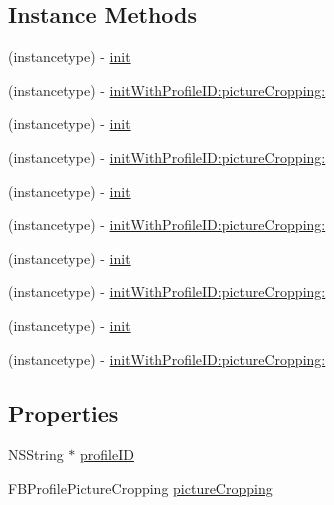 \subsection*{Instance Methods}
\begin{DoxyCompactItemize}
\item 
(instancetype) -\/ \hyperlink{interfaceFBProfilePictureView_aaef716a319774e7c6d21ae51accaf449}{init}
\item 
(instancetype) -\/ \hyperlink{interfaceFBProfilePictureView_ac31bbd3ec87c79d3b1ccd4f3466e46b1}{init\+With\+Profile\+I\+D\+:picture\+Cropping\+:}
\item 
(instancetype) -\/ \hyperlink{interfaceFBProfilePictureView_aaef716a319774e7c6d21ae51accaf449}{init}
\item 
(instancetype) -\/ \hyperlink{interfaceFBProfilePictureView_ac31bbd3ec87c79d3b1ccd4f3466e46b1}{init\+With\+Profile\+I\+D\+:picture\+Cropping\+:}
\item 
(instancetype) -\/ \hyperlink{interfaceFBProfilePictureView_aaef716a319774e7c6d21ae51accaf449}{init}
\item 
(instancetype) -\/ \hyperlink{interfaceFBProfilePictureView_ac31bbd3ec87c79d3b1ccd4f3466e46b1}{init\+With\+Profile\+I\+D\+:picture\+Cropping\+:}
\item 
(instancetype) -\/ \hyperlink{interfaceFBProfilePictureView_aaef716a319774e7c6d21ae51accaf449}{init}
\item 
(instancetype) -\/ \hyperlink{interfaceFBProfilePictureView_ac31bbd3ec87c79d3b1ccd4f3466e46b1}{init\+With\+Profile\+I\+D\+:picture\+Cropping\+:}
\item 
(instancetype) -\/ \hyperlink{interfaceFBProfilePictureView_aaef716a319774e7c6d21ae51accaf449}{init}
\item 
(instancetype) -\/ \hyperlink{interfaceFBProfilePictureView_ac31bbd3ec87c79d3b1ccd4f3466e46b1}{init\+With\+Profile\+I\+D\+:picture\+Cropping\+:}
\end{DoxyCompactItemize}
\subsection*{Properties}
\begin{DoxyCompactItemize}
\item 
N\+S\+String $\ast$ \hyperlink{interfaceFBProfilePictureView_a5aaebc13e66a2d258e3511f5ba3fa294}{profile\+ID}
\item 
F\+B\+Profile\+Picture\+Cropping \hyperlink{interfaceFBProfilePictureView_a04f8436a72d2c64e8ef233baebbec56a}{picture\+Cropping}
\end{DoxyCompactItemize}


